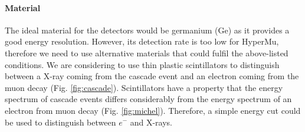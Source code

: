 \documentclass[12pt]{article}
\begin{document}
\paragraph{Material}
The ideal material for the detectors would be germanium (Ge) as it provides a good energy resolution. However, its detection rate is too low for HyperMu, therefore we need to use alternative materials that could fulfil the above-listed conditions. We are considering to use thin plastic scintillators to distinguish between a X-ray coming from the cascade event and an electron coming from the muon decay (Fig. \ref{fig:cascade}). Scintillators have a property that the energy spectrum of cascade events differs considerably from the energy spectrum of an electron from muon decay (Fig. \ref{fig:michel}). Therefore, a simple energy cut could be used to distinguish between $e^-$ and X-rays.
\end{document}
